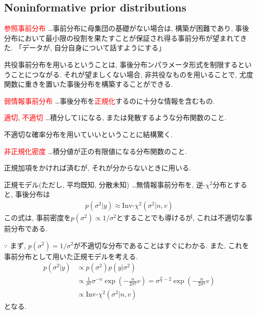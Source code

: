 \documentclass[11pt,a4pape,dvipdfmx]{jarticle}
\newcommand{\eqn}[1]{\begin{align*}#1\end{align*}}
\newcommand{\tcr}[1]{\textcolor{red}{#1}}
\begin{document}
\subsection{Noninformative prior distributions}
\begin{itembox}[l]{\tcr{参照事前分布}}
…事前分布に母集団の基礎がない場合は, 構築が困難であり, 事後分布において最小限の役割を果たすことが保証され得る事前分布が望まれてきた.
「データが, 自分自身について話すようにする」
\end{itembox}

共役事前分布を用いるということは, 事後分布ンパラメータ形式を制限するということにつながる.
それが望ましくない場合, 非共役なものを用いることで, 尤度関数に重きを置いた事後分布を構築することができる.


\begin{itembox}[l]{\tcr{弱情報事前分布}}
…事後分布を\tcr{正規化}するのに十分な情報を含むもの.
\end{itembox}


\begin{itembox}[l]{\tcr{適切}, \tcr{不適切}}
…積分して1になる, または発散するような分布関数のこと.
\end{itembox}

不適切な確率分布を用いていいということに結構驚く.


\begin{itembox}[l]{\tcr{非正規化密度}}
…積分値が正の有限値になる分布関数のこと.
\end{itembox}

正規加項をかければ済むが, それが分からないときに用いる.


\begin{itembox}[l]{正規モデル(ただし, 平均既知, 分散未知)}
…無情報事前分布を, 逆-$\chi^2$分布とすると, 事後分布は
\eqn{p(\sigma^2|y)\approx \text{Inv-}\chi^2(\sigma^2|n,v)}
この式は, 事前密度を$p(\sigma^2)\propto 1/\sigma^2$とすることでも導けるが, これは不適切な事前分布である.
\end{itembox}
$\because$
まず, $p(\sigma^2)=1/\sigma^2$が不適切な分布であることはすぐにわかる.
また, これを事前分布として用いた正規モデルを考える.
\eqn{p(\sigma^2|y)
&\propto p(\sigma^2)p(y|\sigma^2)\\
&\propto \tfrac{1}{\sigma^2}\sigma^{-n}\exp\left(-\frac{n}{2\sigma^2}v\right)
=\sigma^{\tfrac{n}{2}-2}\exp\left(-\frac{n}{2\sigma^2}v\right)\\
&\propto\text{Inv-}\chi^2(\sigma^2|n,v)}
となる.
\end{document}
